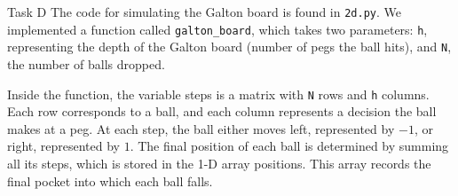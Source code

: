 \begin{task}{Task D}
	The code for simulating the Galton board is found in \texttt{2d.py}. We
	implemented a function called \texttt{galton\_board}, which takes two
	parameters: \texttt{h}, representing the depth of the Galton board
	(number of pegs the ball hits), and \texttt{N}, the number of balls
	dropped.

	Inside the function, the variable steps is a matrix with \texttt{N}
	rows and \texttt{h} columns. Each row corresponds to a ball, and each
	column represents a decision the ball makes at a peg. At each step, the
	ball either moves left, represented by $-1$, or right, represented by
	$1$. The final position of each ball is determined by summing all its
	steps, which is stored in the 1-D array positions. This array records
	the final pocket into which each ball falls.


\end{task}
